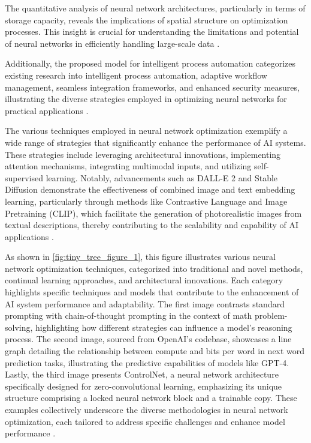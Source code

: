 The quantitative analysis of neural network architectures, particularly in terms of storage capacity, reveals the implications of spatial structure on optimization processes. This insight is crucial for understanding the limitations and potential of neural networks in efficiently handling large-scale data \cite{koyama2001storagecapacitytwodimensionalneural}.

Additionally, the proposed model for intelligent process automation categorizes existing research into intelligent process automation, adaptive workflow management, seamless integration frameworks, and enhanced security measures, illustrating the diverse strategies employed in optimizing neural networks for practical applications \cite{pandy2024advancementsroboticsprocessautomation}.

The various techniques employed in neural network optimization exemplify a wide range of strategies that significantly enhance the performance of AI systems. These strategies include leveraging architectural innovations, implementing attention mechanisms, integrating multimodal inputs, and utilizing self-supervised learning. Notably, advancements such as DALL-E 2 and Stable Diffusion demonstrate the effectiveness of combined image and text embedding learning, particularly through methods like Contrastive Language and Image Pretraining (CLIP), which facilitate the generation of photorealistic images from textual descriptions, thereby contributing to the scalability and capability of AI applications \cite{palmini2024patternscreativityuserinput,zhao2017multiplesourcedomainadaptation}.

As shown in \autoref{fig:tiny_tree_figure_1}, this figure illustrates various neural network optimization techniques, categorized into traditional and novel methods, continual learning approaches, and architectural innovations. Each category highlights specific techniques and models that contribute to the enhancement of AI system performance and adaptability. The first image contrasts standard prompting with chain-of-thought prompting in the context of math problem-solving, highlighting how different strategies can influence a model's reasoning process. The second image, sourced from OpenAI's codebase, showcases a line graph detailing the relationship between compute and bits per word in next word prediction tasks, illustrating the predictive capabilities of models like GPT-4. Lastly, the third image presents ControlNet, a neural network architecture specifically designed for zero-convolutional learning, emphasizing its unique structure comprising a locked neural network block and a trainable copy. These examples collectively underscore the diverse methodologies in neural network optimization, each tailored to address specific challenges and enhance model performance \cite{wei2022chain,GPT-4Techn0,zhang2023adding}.

